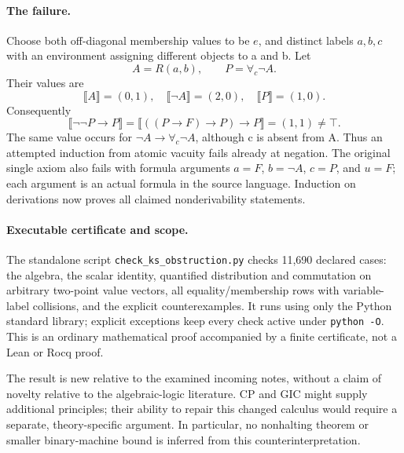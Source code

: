 \paragraph{The failure.}
Choose both off-diagonal membership values to be $e$, and distinct
labels $a,b,c$ with an environment assigning different objects to a and b.
Let
\[
 A=R(a,b),\qquad P=\forall_c\neg A.
\]
Their values are
\[
 \llbracket A\rrbracket=(0,1),\quad
 \llbracket\neg A\rrbracket=(2,0),\quad
 \llbracket P\rrbracket=(1,0).
\]
Consequently
\[
 \llbracket\neg\neg P\to P\rrbracket
 =\llbracket((P\to F)\to P)\to P\rrbracket
 =(1,1)\ne\top.
\]
The same value occurs for $\neg A\to\forall_c\neg A$, although c
is absent from A.  Thus an attempted induction from atomic vacuity
fails already at negation.  The original single axiom also fails with
formula arguments $a=F$, $b=\neg A$, $c=P$, and $u=F$; each argument
is an actual formula in the source language.  Induction on derivations
now proves all claimed nonderivability statements.

\paragraph{Executable certificate and scope.}
The standalone script \texttt{check\_ks\_obstruction.py} checks
11,690 declared cases: the algebra, the scalar identity, quantified
distribution and commutation on arbitrary two-point value vectors,
all equality/membership rows with variable-label collisions, and the
explicit counterexamples.  It runs using only the Python standard
library; explicit exceptions keep every check active under
\texttt{python -O}.  This is an ordinary mathematical proof accompanied
by a finite certificate, not a Lean or Rocq proof.

The result is new relative to the examined incoming notes, without a
claim of novelty relative to the algebraic-logic literature.  CP and
GIC might supply additional principles; their ability to repair this
changed calculus would require a separate, theory-specific argument.
In particular, no nonhalting theorem or smaller binary-machine bound
is inferred from this counterinterpretation.
